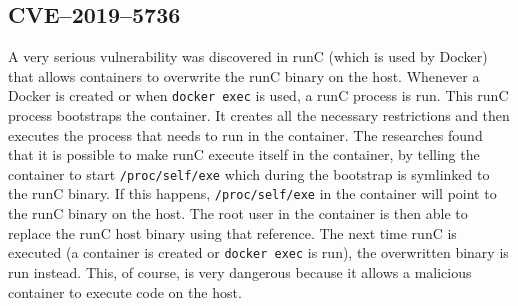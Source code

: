 \subsection{CVE--2019--5736}
A very serious vulnerability was discovered in runC (which is used by Docker) that allows containers to overwrite the runC binary on the host\cite{CVE-2019-5736-DragonSector}\cite{CVE-2019-5736-Github}\cite{CVE-2019-5736-Twistlock}. Whenever a Docker is created or when \lstinline{docker exec} is used, a runC process is run. This runC process bootstraps the container. It creates all the necessary restrictions and then executes the process that needs to run in the container. The researches found that it is possible to make runC execute itself in the container, by telling the container to start \lstinline{/proc/self/exe} which during the bootstrap is symlinked to the runC binary. If this happens, \lstinline{/proc/self/exe} in the container will point to the runC binary on the host. The root user in the container is then able to replace the runC host binary using that reference. The next time runC is executed (a container is created or \lstinline{docker exec} is run), the overwritten binary is run instead. 
This, of course, is very dangerous because it allows a malicious container to execute code on the host.
